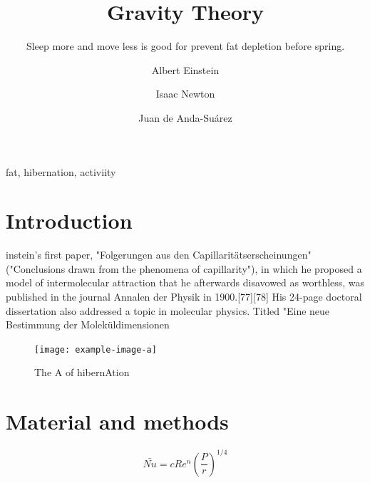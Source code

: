 \documentclass{SFEE}
\begin{document}

\twocolumn

\title{Gravity Theory}
\subtitle{Sleep more and move less is good for prevent fat depletion before   spring.}
\author[1,*]{Albert Einstein }
\author[2]{Isaac Newton}
\author[3]{Juan de Anda-Suárez }
\maketitle
\begin{abstract}
    \lipsum[5]
\end{abstract}
\begin{keywords}
    fat, hibernation, activiity
\end{keywords}

\section{Introduction}

instein's first paper, "Folgerungen aus den Capillaritätserscheinungen" ("Conclusions drawn from the phenomena of capillarity"), in which he proposed a model of intermolecular attraction that he afterwards disavowed as worthless, was published in the journal Annalen der Physik in 1900.[77][78] His 24-page doctoral dissertation also addressed a topic in molecular physics. Titled "Eine neue Bestimmung der Moleküldimensionen \cite{1908JRE.....4..411E}

\begin{figure}[b!]
\texttt{[image: example-image-a]}
\caption{The A of hibernAtion}
\end{figure}
\lipsum[10-13]
\section{Material and methods}
\lipsum[14-17]
\begin{equation}
 \bar{Nu}=cRe^{n}\left ( \frac{P}{r} \right )^{1/4}
\end{equation}
\end{document}

